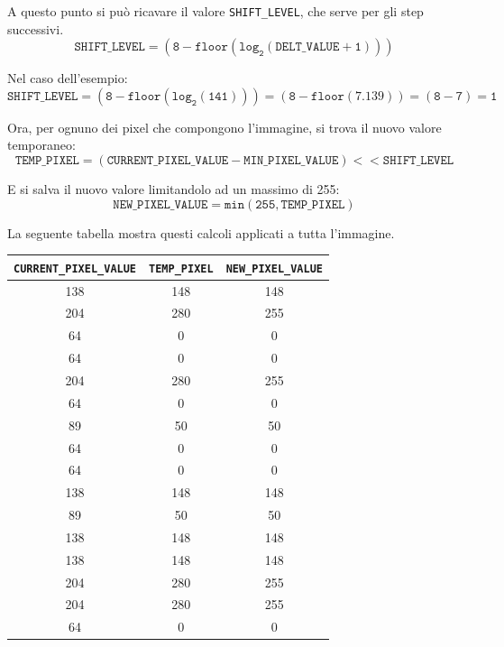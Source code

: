 \documentclass[11pt]{article}
\begin{document}
    A questo punto si può ricavare il valore \texttt{SHIFT\_LEVEL}, che serve per gli step successivi.\\
    $$\mathtt{
    SHIFT\_LEVEL = (8 - floor(log_2(DELT\_VALUE + 1)))
    }$$
    
    Nel caso dell'esempio:\\
    $$\mathtt{
    SHIFT\_LEVEL = (8 - floor(log_2(141))) = (8 - floor(7.139)) = (8 - 7) = 1
    }$$
    
    Ora, per ognuno dei pixel che compongono l'immagine, si trova il nuovo valore temporaneo:\\
    $$\mathtt{
    TEMP\_PIXEL = (CURRENT\_PIXEL\_VALUE - MIN\_PIXEL\_VALUE) << SHIFT\_LEVEL
    }$$
    
    E si salva il nuovo valore limitandolo ad un massimo di 255:\\
    $$\mathtt{
    NEW\_PIXEL\_VALUE = min(255, TEMP\_PIXEL)
    }$$
    
    La seguente tabella mostra questi calcoli applicati a tutta l'immagine.
    
    \renewcommand{\arraystretch}{1.2}
    \begin{center}
        \begin{tabular}{c|c|c}
            \texttt{CURRENT\_PIXEL\_VALUE} & \texttt{TEMP\_PIXEL} & \texttt{NEW\_PIXEL\_VALUE} \\
            \hline
            138 & 148 & 148 \\
            204 & 280 & 255 \\
            64 & 0 & 0 \\
            64 & 0 & 0 \\
            204 & 280 & 255\\
            64 & 0 & 0 \\
            89 & 50 & 50 \\
            64 & 0 & 0 \\
            64 & 0 & 0 \\
            138 & 148 & 148 \\
            89 & 50 & 50 \\
            138 & 148 & 148 \\
            138 & 148 & 148 \\
            204 & 280 & 255 \\
            204 & 280 & 255 \\
            64 & 0 & 0 \\
        \end{tabular}
    \end{center}
    
\end{document}
